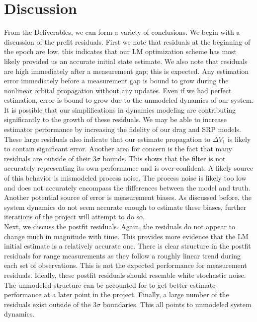 \documentclass[11pt]{article}
\begin{document}
 
\section{Discussion}

From the Deliverables, we can form a variety of conclusions. We begin with a discussion of the prefit residuals. First we note that residuals at the beginning of the epoch are low, this indicates that our LM optimization scheme has most likely provided us an accurate initial state estimate. We also note that residuals are high immediately after a measurement gap; this is expected. Any estimation error immediately before a measurement gap is bound to grow during the nonlinear orbital propagation without any updates. Even if we had perfect estimation, error is bound to grow due to the unmodeled dynamics of our system. It is possible that our simplifications in dynamics modeling are contributing significantly to the growth of these residuals. We may be able to increase estimator performance by increasing the fidelity of our drag and SRP models. \\

These large residuals also indicate that our estimate propagation to $\Delta V_1$ is likely to contain significant error. Another area for concern is the fact that many residuals are outside of their $3\sigma$ bounds. This shows that the filter is not accurately representing its own performance and is over-confident. A likely source of this behavior is mismodeled process noise. The process noise is likely too low and does not accurately encompass the differences between the model and truth. Another potential source of error is measurement biases. As discussed before, the system dynamics do not seem accurate enough to estimate these biases, further iterations of the project will attempt to do so. \\

Next, we discuss the postfit residuals. Again, the residuals do not appear to change much in magnitude with time. This provides more evidence that the LM initial estimate is a relatively accurate one. There is clear structure in the postfit residuals for range measurements as they follow a roughly linear trend during each set of observations. This is not the expected performance for measurement residuals. Ideally, these postfit residuals should resemble white stochastic noise. The unmodeled structure can be accounted for to get better estimate performance at a later point in the project. Finally, a large number of the residuals exist outside of the $3\sigma$ boundaries. This all points to unmodeled system dynamics. \\
\end{document}
